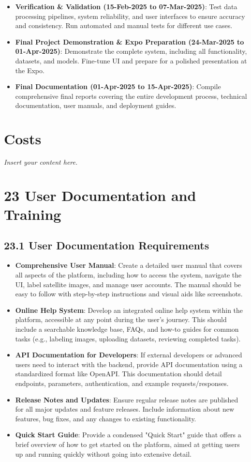 \documentclass[12pt]{article}
\newcommand{\lips}{\textit{Insert your content here.}}
\begin{document}
\begin{itemize}[leftmargin=2cm]
    \item \textbf{Verification \& Validation (15-Feb-2025 to 07-Mar-2025)}: Test data processing pipelines, system reliability, and user interfaces to ensure accuracy and consistency. Run automated and manual tests for different use cases.
    \item \textbf{Final Project Demonstration \& Expo Preparation (24-Mar-2025 to 01-Apr-2025)}: Demonstrate the complete system, including all functionality, datasets, and models. Fine-tune UI and prepare for a polished presentation at the Expo.
    \item \textbf{Final Documentation (01-Apr-2025 to 15-Apr-2025)}: Compile comprehensive final reports covering the entire development process, technical documentation, user manuals, and deployment guides.
\end{itemize}


\section{Costs}
\lips

\section*{23 User Documentation and Training}

\subsection*{23.1 User Documentation Requirements}
\begin{itemize}[leftmargin=2cm]
    \item \textbf{Comprehensive User Manual}: Create a detailed user manual that covers all aspects of the platform, including how to access the system, navigate the UI, label satellite images, and manage user accounts. The manual should be easy to follow with step-by-step instructions and visual aids like screenshots.
    \item \textbf{Online Help System}: Develop an integrated online help system within the platform, accessible at any point during the user's journey. This should include a searchable knowledge base, FAQs, and how-to guides for common tasks (e.g., labeling images, uploading datasets, reviewing completed tasks).
    \item \textbf{API Documentation for Developers}: If external developers or advanced users need to interact with the backend, provide API documentation using a standardized format like OpenAPI. This documentation should detail endpoints, parameters, authentication, and example requests/responses.
    \item \textbf{Release Notes and Updates}: Ensure regular release notes are published for all major updates and feature releases. Include information about new features, bug fixes, and any changes to existing functionality.
    \item \textbf{Quick Start Guide}: Provide a condensed "Quick Start" guide that offers a brief overview of how to get started on the platform, aimed at getting users up and running quickly without going into extensive detail.
\end{itemize}
\end{document}
